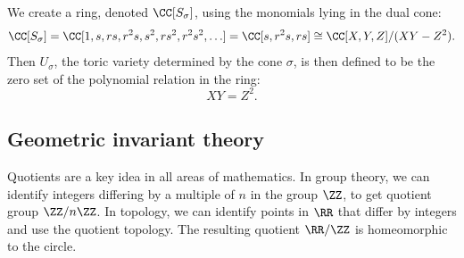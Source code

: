 \documentclass[12pt]{amsart}
\theoremstyle{plain}
\theoremstyle{definition}
\begin{document}
\begin{figure}[H]
\end{figure}
\noindent
We create a ring, denoted $\CC[S_\sigma]$, using the monomials lying in the dual cone:
$$\CC[S_\sigma] = \CC[1, s, rs, r^2s, s^2,  rs^2, r^2s^2, \ldots] = \CC[s, r^2s, rs] \cong \CC[X, Y, Z]/(XY - Z^2).$$
Then $U_\sigma$, the toric variety determined by the cone $\sigma$, is then defined to be the zero set of the polynomial relation in the ring:
$$XY = Z^2.$$

\newpage
\subsection*{Geometric invariant theory}
Quotients are a key idea in all areas of mathematics.
In group theory, we can identify integers differing by a multiple of $n$ in the group $\ZZ$, to get quotient group $\ZZ/n \ZZ$.
In topology, we can identify points in $\RR$ that differ by integers and use the quotient topology.
The resulting quotient $\RR/\ZZ$ is homeomorphic to the circle.
\end{document}
